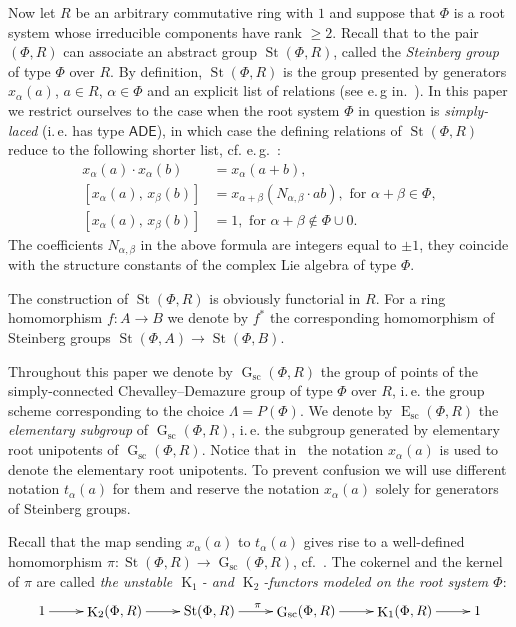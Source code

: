 \documentclass[oneside, 10pt]{amsart}
\DeclareMathOperator{\St}{St}
\DeclareMathOperator{\E}{E}
\DeclareMathOperator{\G}{G}
\newcommand{\Gsc}{\G_\mathrm{sc}}
\newcommand{\Esc}{\E_\mathrm{sc}}
\DeclareMathOperator{\K}{K}
\numberwithin{equation}{section}
\numberwithin{thm}{section}
\numberwithin{lemma}{section}
\theoremstyle{definition}
\theoremstyle{remark}
\begin{document}
Now let $R$ be an arbitrary commutative ring with $1$ and suppose that $\Phi$ is a root system whose irreducible components have rank $\geq 2$.
Recall that to the pair $(\Phi, R)$ can associate an abstract group $\St(\Phi, R)$, called the \textit{Steinberg group} of type $\Phi$ over $R$.
By definition, $\St(\Phi, R)$ is the group presented by generators $x_\alpha(a)$, $a \in R$, $\alpha \in \Phi$ and an explicit list of relations (see e.\,g in.~\cite{Ma69, St71}).
In this paper we restrict ourselves to the case when the root system $\Phi$ in question is \textit{simply-laced} (i.\,e. has type $\mathsf{ADE}$),
in which case the defining relations of $\St(\Phi, R)$ reduce to the following shorter list, cf. e.\,g.~\cite[\S~2.2]{S15}:
\begin{align}
x_{\alpha}(a)\cdot x_{\alpha}(b) & =x_{\alpha}(a+b), \tag{R1} \label{x-additivity}\\
[x_{\alpha}(a),\,x_{\beta}(b)]   & =x_{\alpha+\beta}(N_{\alpha,\beta} \cdot ab),\text{ for }\alpha+\beta\in\Phi, \tag{R2} \label{R2} \\
[x_{\alpha}(a),\,x_{\beta}(b)]   & =1,\text{ for }\alpha+\beta\not\in\Phi\cup0. \tag{R3} \label{R3}
\end{align}
The coefficients $N_{\alpha,\beta}$ in the above formula are integers equal to $\pm 1$, they coincide with the structure constants of the complex Lie algebra of type $\Phi$.

The construction of $\St(\Phi, R)$ is obviously functorial in $R$.
For a ring homomorphism $ f\colon A \to B$ we denote by $f^*$ the corresponding homomorphism of Steinberg groups $\St(\Phi, A) \to \St(\Phi, B)$.

Throughout this paper we denote by $\Gsc(\Phi, R)$ the group of points of the simply-connected Chevalley--Demazure group of type $\Phi$ over $R$,
 i.\,e. the group scheme corresponding to the choice $\Lambda = P(\Phi)$.
We denote by $\Esc(\Phi, R)$ the \textit{elementary subgroup} of $\Gsc(\Phi, R)$, i.\,e. the subgroup generated by elementary root unipotents of $\Gsc(\Phi, R)$.
Notice that in~\cite{Vav09, VP} the notation $x_\alpha(a)$ is used to denote the elementary root unipotents.
To prevent confusion we will use different notation $t_\alpha(a)$ for them and reserve the notation $x_\alpha(a)$ solely for generators of Steinberg groups.

Recall that the map sending $x_\alpha(a)$ to $t_\alpha(a)$ gives rise to a well-defined homomorphism $\pi \colon \St(\Phi, R) \to \G_\mathrm{sc}(\Phi, R)$, cf.~\cite[\S~1A]{St78}.
The cokernel and the kernel of $\pi$ are called \textit{the unstable $\K_1$- and $\K_2$-functors modeled on the root system $\Phi$}:
\begin{equation} \label{eq:K1-K2-sequence}
\xymatrix{ 1 \ar[r] & \K_2(\Phi, R) \ar[r] & \St(\Phi, R) \ar[r]^{\pi} & \Gsc(\Phi, R) \ar[r] & \K_1(\Phi, R) \ar[r] & 1}
\end{equation}
\end{document}
